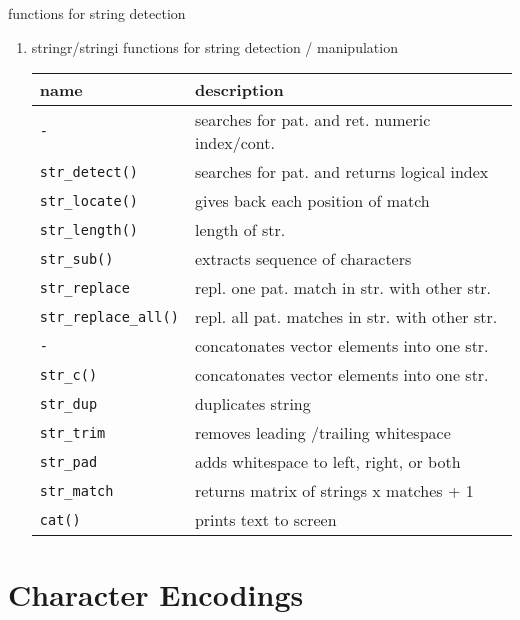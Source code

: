 \documentclass[ignorenonframetext,]{beamer}
\begin{document}
\begin{frame}[fragile]{functions for string detection}

\begin{enumerate}
\def\labelenumi{\arabic{enumi})}
\setcounter{enumi}{5}
\item
  stringr/stringi functions for string detection / manipulation

  \begin{longtable}[c]{@{}ll@{}}
  \toprule
  name & description\tabularnewline
  \midrule
  \endhead
  \texttt{-} & searches for pat. and ret. numeric
  index/cont.\tabularnewline
  \texttt{str\_detect()} & searches for pat. and returns logical
  index\tabularnewline
  \texttt{str\_locate()} & gives back each position of
  match\tabularnewline
  \texttt{str\_length()} & length of str.\tabularnewline
  \texttt{str\_sub()} & extracts sequence of characters\tabularnewline
  \texttt{str\_replace} & repl. one pat. match in str. with other
  str.\tabularnewline
  \texttt{str\_replace\_all()} & repl. all pat. matches in str. with
  other str.\tabularnewline
  \texttt{-} & concatonates vector elements into one str.\tabularnewline
  \texttt{str\_c()} & concatonates vector elements into one
  str.\tabularnewline
  \texttt{str\_dup} & duplicates string\tabularnewline
  \texttt{str\_trim} & removes leading /trailing
  whitespace\tabularnewline
  \texttt{str\_pad} & adds whitespace to left, right, or
  both\tabularnewline
  \texttt{str\_match} & returns matrix of strings x matches +
  1\tabularnewline
  \texttt{cat()} & prints text to screen\tabularnewline
  \bottomrule
  \end{longtable}
\end{enumerate}

\end{frame}

\section{Character Encodings}\label{character-encodings}
\end{document}
